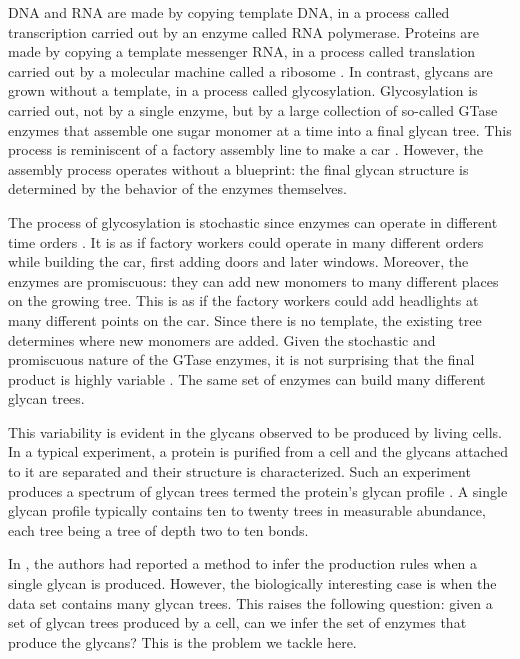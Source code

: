 
DNA and RNA are made by copying template DNA, in a process called transcription carried out by an enzyme called RNA polymerase. Proteins are made by copying a template messenger RNA, in a process called translation carried out by a molecular machine called a ribosome \cite{alberts2013essential}. In contrast, glycans are grown without a template, in a process called glycosylation. Glycosylation is carried out, not by a single enzyme, but by a large collection of so-called GTase enzymes that assemble one sugar monomer at a time into a final glycan tree. This process is reminiscent of a factory assembly line to make a car \cite{Jaiman2018}. However, the assembly process operates without a blueprint: the final glycan structure is determined by the behavior of the enzymes themselves.

The process of glycosylation is stochastic since enzymes can operate in different time orders \cite{Spahn2016}. It is as if factory workers could operate in many different orders while building the car, first adding doors and later windows. Moreover, the enzymes are promiscuous: they can add new monomers to many different places on the growing tree. This is as if the factory workers could add headlights at many different points on the car. Since there is no template, the existing tree determines where new monomers are added. Given the stochastic and promiscuous nature of the GTase enzymes, it is not surprising that the final product is highly variable \cite{Spahn2014}. The same set of enzymes can build many different glycan trees.

This variability is evident in the glycans observed to be produced by living cells. In a typical experiment, a protein is purified from a cell and the glycans attached to it are separated and their structure is characterized. Such an experiment produces a spectrum of glycan trees termed the protein's glycan profile \cite{Spahn2014}. A single glycan profile typically contains ten to twenty trees in measurable abundance, each tree being a tree of depth two to ten bonds. 

In \cite{Jaiman440792}, the authors had reported a method to infer the production rules when a single glycan is produced. However, the biologically interesting case is when the data set contains many glycan trees. This raises the following question: given a set of glycan trees produced by a cell,
can we infer the set of enzymes that produce the glycans? This is the problem we tackle here.


